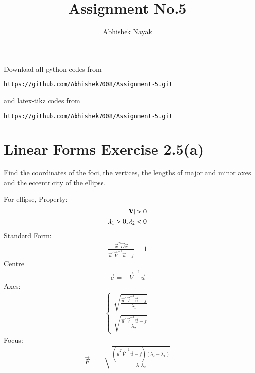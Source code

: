 \documentclass[journal,12pt,twocolumn]{IEEEtran}
\begin{document}
\def\rightbox#1{\makebox[0in][r]{#1}}
\def\centbox#1{\makebox[0in]{#1}}
\def\topbox#1{\raisebox{-\baselineskip}[0in][0in]{#1}}
\def\midbox#1{\raisebox{-0.5\baselineskip}[0in][0in]{#1}}
\vspace{3cm}
\title{Assignment No.5}
\author{Abhishek Nayak}
\maketitle
\newpage
\bigskip
\renewcommand{\thefigure}{\theenumi}
\renewcommand{\thetable}{\theenumi}
Download all python codes from
\begin{lstlisting}
https://github.com/Abhishek7008/Assignment-5.git
\end{lstlisting}
%
and latex-tikz codes from
%
\begin{lstlisting}
https://github.com/Abhishek7008/Assignment-5.git
\end{lstlisting}
%
\section{Linear Forms Exercise 2.5(a)}
Find the coordinates of the foci, the vertices,
the lengths of major and minor axes and the
eccentricity of the ellipse.

\begin{lemma}
For ellipse,
Property:
\begin{align}
    \left\vert\mathbf{V}\right\vert > 0
    \\
    \lambda_1>0,\lambda_2<0
\end{align}
Standard Form:
\begin{align}
    \frac{\vec{x}^T\vec{D}\vec{x}}{\vec{u}^T\vec{V}^{-1}\vec{u}-f}=1 \label{eq1}
\end{align}
Centre:
\begin{align}
    \vec{c} = -\vec{V}^{-1}\vec{u}
\end{align}
Axes:
\begin{align}
\begin{cases}
    \sqrt{\frac{\vec{u}^T\vec{V}^{-1}\vec{u}-f}{\lambda_1}}
    \\
    \sqrt{\frac{\vec{u}^T\vec{V}^{-1}\vec{u}-f}{\lambda_2}}
\end{cases}
\end{align}
Focus:
\begin{align}
    \vec{F} &= \sqrt{\frac{(\vec{u}^T\vec{V}^{-1}\vec{u}-f)(\lambda_2-\lambda_1)}{\lambda_1\lambda_2}}
\end{align}
\end{lemma}
\end{document}
